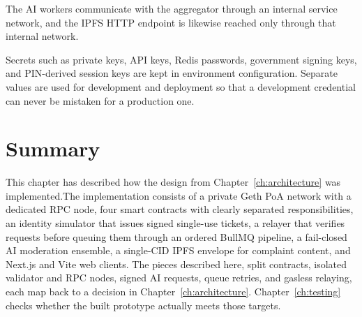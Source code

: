 The AI workers communicate with the aggregator through an internal service network, and the IPFS HTTP endpoint is likewise reached only through that internal network.

Secrets such as private keys, API keys, Redis passwords, government signing keys, and PIN-derived session keys are kept in environment configuration. Separate values are used for development and deployment so that a development credential can never be mistaken for a production one.

\section{Summary}
\label{sec:implementation-summary}

This chapter has described how the design from Chapter~\ref{ch:architecture} was implemented.The implementation consists of a private Geth \ac{PoA} network with a dedicated RPC node, four smart contracts with clearly separated responsibilities, an identity simulator that issues signed single-use tickets, a relayer that verifies requests before queuing them through an ordered BullMQ pipeline, a fail-closed AI moderation ensemble, a single-CID IPFS envelope for complaint content, and Next.js and Vite web clients. The pieces described here, split contracts, isolated validator and RPC nodes, signed AI requests, queue retries, and gasless relaying, each map back to a decision in Chapter~\ref{ch:architecture}. Chapter~\ref{ch:testing} checks whether the built prototype actually meets those targets.
